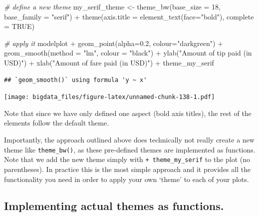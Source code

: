 \documentclass[
  12pt,
]{style/krantz}
\newenvironment{Shaded}{\begin{snugshade}}{\end{snugshade}}
\newcommand{\AttributeTok}[1]{\textcolor[rgb]{0.77,0.63,0.00}{#1}}
\newcommand{\CommentTok}[1]{\textcolor[rgb]{0.56,0.35,0.01}{\textit{#1}}}
\newcommand{\ConstantTok}[1]{\textcolor[rgb]{0.00,0.00,0.00}{#1}}
\newcommand{\DecValTok}[1]{\textcolor[rgb]{0.00,0.00,0.81}{#1}}
\newcommand{\FloatTok}[1]{\textcolor[rgb]{0.00,0.00,0.81}{#1}}
\newcommand{\FunctionTok}[1]{\textcolor[rgb]{0.00,0.00,0.00}{#1}}
\newcommand{\NormalTok}[1]{#1}
\newcommand{\OtherTok}[1]{\textcolor[rgb]{0.56,0.35,0.01}{#1}}
\newcommand{\SpecialCharTok}[1]{\textcolor[rgb]{0.00,0.00,0.00}{#1}}
\newcommand{\StringTok}[1]{\textcolor[rgb]{0.31,0.60,0.02}{#1}}
\begin{document}
\begin{Shaded}
\begin{Highlighting}[]
\CommentTok{\# \textquotesingle{}define\textquotesingle{} a new theme}
\NormalTok{my\_serif\_theme }\OtherTok{\textless{}{-}}      
  \FunctionTok{theme\_bw}\NormalTok{(}\AttributeTok{base\_size =} \DecValTok{18}\NormalTok{, }\AttributeTok{base\_family =} \StringTok{"serif"}\NormalTok{) }\SpecialCharTok{+}
  \FunctionTok{theme}\NormalTok{(}\AttributeTok{axis.title =} \FunctionTok{element\_text}\NormalTok{(}\AttributeTok{face=}\StringTok{"bold"}\NormalTok{), }\AttributeTok{complete =} \ConstantTok{TRUE}\NormalTok{)}

\CommentTok{\# apply it }
\NormalTok{modelplot }\SpecialCharTok{+}
     \FunctionTok{geom\_point}\NormalTok{(}\AttributeTok{alpha=}\FloatTok{0.2}\NormalTok{, }\AttributeTok{colour=}\StringTok{"darkgreen"}\NormalTok{) }\SpecialCharTok{+}
     \FunctionTok{geom\_smooth}\NormalTok{(}\AttributeTok{method =} \StringTok{"lm"}\NormalTok{, }\AttributeTok{colour =} \StringTok{"black"}\NormalTok{) }\SpecialCharTok{+}
     \FunctionTok{ylab}\NormalTok{(}\StringTok{"Amount of tip paid (in USD)"}\NormalTok{) }\SpecialCharTok{+}
     \FunctionTok{xlab}\NormalTok{(}\StringTok{"Amount of fare paid (in USD)"}\NormalTok{) }\SpecialCharTok{+}
\NormalTok{  theme\_my\_serif}
\end{Highlighting}
\end{Shaded}

\begin{verbatim}
## `geom_smooth()` using formula 'y ~ x'
\end{verbatim}

\texttt{[image: bigdata\_files/figure-latex/unnamed-chunk-138-1.pdf]}

Note that since we have only defined one aspect (bold axis titles), the rest of the elements follow the default theme.

Importantly, the approach outlined above does technically not really create a new theme like \texttt{theme\_bw()}, as these pre-defined themes are implemented as functions. Note that we add the new theme simply with \texttt{+\ theme\_my\_serif} to the plot (no parentheses). In practice this is the most simple approach and it provides all the functionality you need in order to apply your own `theme' to each of your plots.

\hypertarget{implementing-actual-themes-as-functions.}{%
\subsection{Implementing actual themes as functions.}\label{implementing-actual-themes-as-functions.}}
\end{document}
